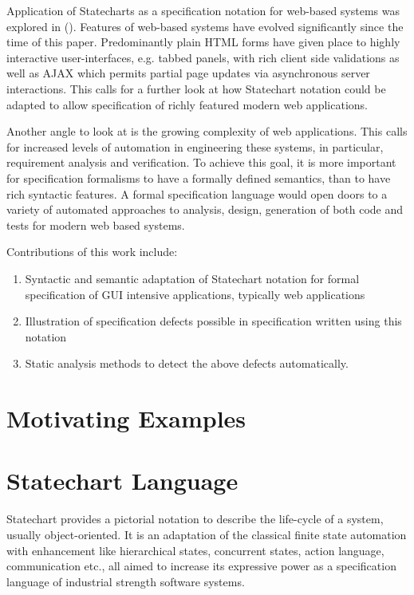 \documentclass[12pt,a4paper]{article}
\begin{document}
Application of Statecharts as a specification notation for web-based systems was explored in (). Features of web-based systems have evolved significantly since the time of this paper. Predominantly plain HTML forms have given place to highly interactive user-interfaces, e.g. tabbed panels, with rich client side validations as well as AJAX which permits partial page updates via asynchronous server interactions. This calls for a further look at how Statechart notation could be adapted to allow specification of richly featured modern web applications.

Another angle to look at is the growing complexity of web applications. This calls for increased levels of automation in engineering these systems, in particular, requirement analysis and verification. To achieve this goal, it is more important for specification formalisms to have a formally defined semantics,  than to have rich syntactic features. A formal specification language would open doors to a variety of automated approaches to analysis, design, generation of both code and tests for modern web based systems.

Contributions of this work include:
\begin{enumerate}
	\item Syntactic and semantic adaptation of Statechart notation for formal specification of GUI intensive applications, typically web applications
	\item Illustration of specification defects possible in specification written using this notation
	\item Static analysis methods to detect the above defects automatically.
\end{enumerate}

\section{Motivating Examples}

\section{Statechart Language}
Statechart provides a pictorial notation to describe the life-cycle of a system, usually object-oriented. It is an adaptation of the classical finite state automation with enhancement like hierarchical states, concurrent states, action language, communication etc., all aimed to increase its expressive power as a specification language of industrial strength software systems. 
\end{document}
